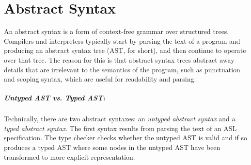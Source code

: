 \chapter{Abstract Syntax\label{chap:AbstractSyntax}}
An abstract syntax is a form of context-free grammar over structured trees.
Compilers and interpreters typically start by parsing the text of a program and producing an abstract syntax tree (AST, for short),
and then continue to operate over that tree.
%
The reason for this is that abstract syntax trees abstract away details that are irrelevant to the semantics of the program,
such as punctuation and scoping syntax, which are useful for readability and parsing.

\hypertarget{def-typedast}{}
\hypertarget{def-untypedast}{}
\paragraph{Untyped AST vs. Typed AST:}
Technically, there are two abstract syntaxes:
an \emph{untyped abstract syntax} and a \emph{typed abstract syntax}.
The first syntax results from parsing the text of an ASL specification.
The type checker checks whether the untyped AST is valid and if so produces
a typed AST where some nodes in the untyped AST have been transformed to
more explicit representation.

